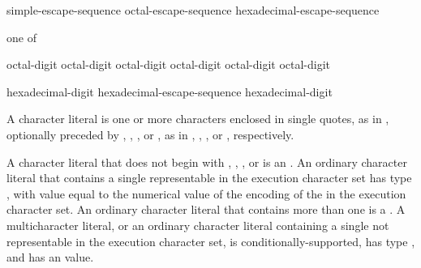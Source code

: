 \begin{bnf}
\br
    simple-escape-sequence\br
    octal-escape-sequence\br
    hexadecimal-escape-sequence
\end{bnf}

\begin{bnf}
 \textnormal{one of}\br
    \quad{}\quad{}\quad\terminal{\textbackslash\textbackslash}\br
    \quad{}\quad{}\quad{}\quad{}\quad{}\quad{}
\end{bnf}

\begin{bnf}
\br
    \terminal{\textbackslash} octal-digit\br
    \terminal{\textbackslash} octal-digit octal-digit\br
    \terminal{\textbackslash} octal-digit octal-digit octal-digit
\end{bnf}

\begin{bnf}
\br
     hexadecimal-digit\br
    hexadecimal-escape-sequence hexadecimal-digit
\end{bnf}

\pnum
{}%
%
%
%
A character literal is one or more characters enclosed in single quotes,
as in , optionally preceded by
, , , or ,
as in
, , , or ,
respectively.

\pnum
{}%
A character literal that does not begin with
, , , or 
is an .
An ordinary character literal that contains a
single  representable in the execution character
set has type , with value equal to the
numerical value of the encoding of the  in the
execution character set. An ordinary character literal that contains
more than one  is a
%
.
A multicharacter literal, or an ordinary character literal containing
a single  not representable in the execution
character set, is conditionally-supported, has type ,
%
and has an  value.
 
